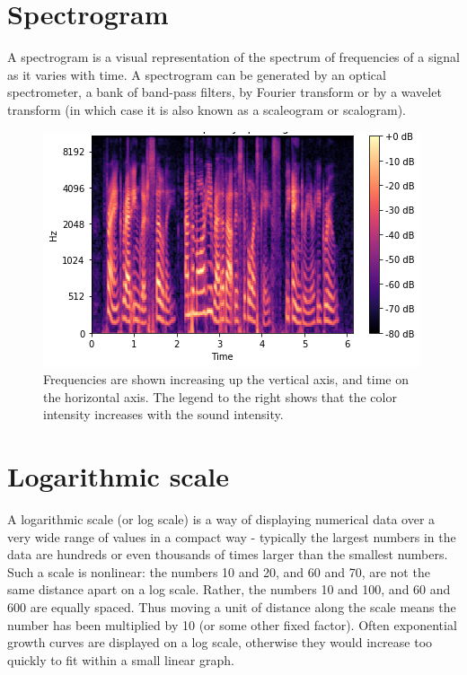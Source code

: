 \documentclass[journal,compsoc]{IEEEtran}
\begin{document}
\section{Spectrogram}
A spectrogram is a visual representation of the spectrum of frequencies of a signal as it varies with time. A spectrogram can be generated by an optical spectrometer, a bank of band-pass filters, by Fourier transform or by a wavelet transform (in which case it is also known as a scaleogram or scalogram).

\begin{figure}[H]
\begin{center}
\includegraphics[scale=0.5]{spectrogram}
		\caption{Frequencies are shown increasing up the vertical axis, and time on the horizontal axis. The legend to the right shows that the color intensity increases with the sound intensity.}
\end{center}
\end{figure}

\section{Logarithmic scale}
A logarithmic scale (or log scale) is a way of displaying numerical data over a very wide range of values in a compact way - typically the largest numbers in the data are hundreds or even thousands of times larger than the smallest numbers. Such a scale is nonlinear: the numbers 10 and 20, and 60 and 70, are not the same distance apart on a log scale. Rather, the numbers 10 and 100, and 60 and 600 are equally spaced. Thus moving a unit of distance along the scale means the number has been multiplied by 10 (or some other fixed factor). Often exponential growth curves are displayed on a log scale, otherwise they would increase too quickly to fit within a small linear graph.
\end{document}
